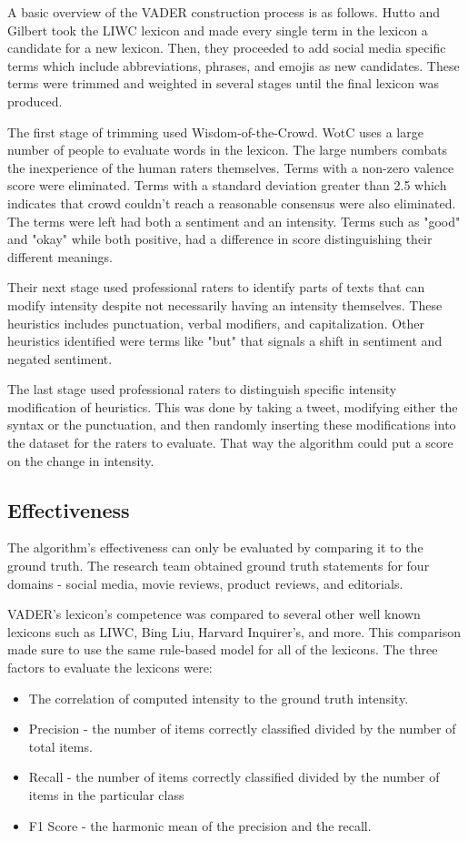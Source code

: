 \documentclass[11pt, twoside, reqno]{book}
\begin{document}
A basic overview of the VADER construction process is as follows. Hutto and Gilbert took the LIWC lexicon and made every single term in the lexicon a candidate for a new lexicon. Then, they proceeded to add social media specific terms which include abbreviations, phrases, and emojis as new candidates. These terms were trimmed and weighted in several stages until the final lexicon was produced. 

The first stage of trimming used Wisdom-of-the-Crowd. WotC uses a large number of people to evaluate words in the lexicon. The large numbers combats the inexperience of the human raters themselves. Terms with a non-zero valence score were eliminated. Terms with a standard deviation greater than 2.5 which indicates that crowd couldn't reach a reasonable consensus were also eliminated. The terms were left had both a sentiment and an intensity. Terms such as "good" and "okay" while both positive, had a difference in score distinguishing their different meanings. 

Their next stage used professional raters to identify parts of texts that can modify intensity despite not necessarily having an intensity themselves. These heuristics includes punctuation, verbal modifiers, and capitalization. Other heuristics identified were terms like "but" that signals a shift in sentiment and negated sentiment. 

The last stage used professional raters to distinguish specific intensity modification of heuristics. This was done by taking a tweet, modifying either the syntax or the punctuation, and then randomly inserting these modifications into the dataset for the raters to evaluate. That way the algorithm could put a score on the change in intensity. 

\subsection{Effectiveness}
\hspace{0.2in} The algorithm's effectiveness can only be evaluated by comparing it to the ground truth. The research team obtained ground truth statements for four domains - social media, movie reviews, product reviews, and editorials. 

VADER's lexicon's competence was compared to several other well known lexicons such as LIWC, Bing Liu, Harvard Inquirer's, and more. This comparison made sure to use the same rule-based model for all of the lexicons. The three factors to evaluate the lexicons were:
\begin{itemize}
	\item The correlation of computed intensity to the ground truth intensity. 
	\item Precision - the number of items correctly classified divided by the number of total items. 
	\item Recall - the number of items correctly classified divided by the number of items in the particular class
	\item F1 Score - the harmonic mean of the precision and the recall.
\end{itemize}
\end{document}
